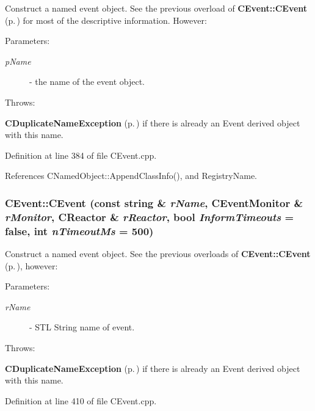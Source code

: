 Construct a named event object. See the previous overload of {\bf CEvent::CEvent} {\rm (p.\,\pageref{classCEvent_a0})} for most of the descriptive information. However:\begin{Desc}
\item[Parameters: ]\par
\begin{description}
\item[{\em 
p\-Name}]- the name of the event object.\end{description}
\end{Desc}
Throws:\begin{CompactItemize}
\item 
{\bf CDuplicate\-Name\-Exception} {\rm (p.\,\pageref{classCDuplicateNameException})} if there is already an Event derived object with this name. \end{CompactItemize}


Definition at line 384 of file CEvent.cpp.

References CNamed\-Object::Append\-Class\-Info(), and Registry\-Name.
\subsubsection{\setlength{\rightskip}{0pt plus 5cm}CEvent::CEvent (const string \& {\em r\-Name}, {\bf CEvent\-Monitor} \& {\em r\-Monitor}, {\bf CReactor} \& {\em r\-Reactor}, bool {\em Inform\-Timeouts} = false, int {\em n\-Timeout\-Ms} = 500)}\label{classCEvent_a2}


Construct a named event object. See the previous overloads of  {\bf CEvent::CEvent} {\rm (p.\,\pageref{classCEvent_a0})}, however:\begin{Desc}
\item[Parameters: ]\par
\begin{description}
\item[{\em 
r\-Name}]- STL String name of event.\end{description}
\end{Desc}
Throws:\begin{CompactItemize}
\item 
{\bf CDuplicate\-Name\-Exception} {\rm (p.\,\pageref{classCDuplicateNameException})} if there is already an Event derived object with this name. \end{CompactItemize}


Definition at line 410 of file CEvent.cpp.

